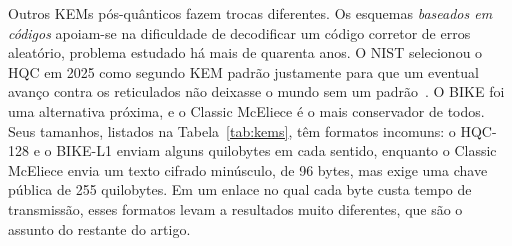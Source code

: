 Outros KEMs pós-quânticos fazem trocas diferentes. Os esquemas \emph{baseados
em códigos} apoiam-se na dificuldade de decodificar um código corretor de erros
aleatório, problema estudado há mais de quarenta anos. O NIST selecionou o HQC
em 2025 como segundo KEM padrão justamente para que um eventual avanço contra
os reticulados não deixasse o mundo sem um padrão~\cite{nisthqc2025}. O BIKE
foi uma alternativa próxima, e o Classic McEliece é o mais conservador de
todos. Seus tamanhos, listados na Tabela~\ref{tab:kems}, têm formatos
incomuns: o HQC-128 e o BIKE-L1 enviam alguns quilobytes em cada sentido,
enquanto o Classic McEliece envia um texto cifrado minúsculo, de 96 bytes, mas
exige uma chave pública de 255 quilobytes. Em um enlace no qual cada byte custa
tempo de transmissão, esses formatos levam a resultados muito diferentes, que
são o assunto do restante do artigo.
